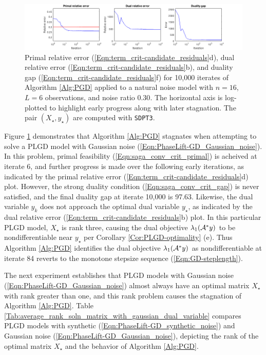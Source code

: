\begin{enumerate}
\begin{figure}[H]
\hspace{-1.7cm}  \includegraphics[scale=0.6]{noisy_random_signal_relative_errors_stagnate}
\caption{Primal relative error (\ref{Eqn:term_crit-candidate_residuals}d), dual relative error (\ref{Eqn:term_crit-candidate_residuals}b), and duality gap (\ref{Eqn:term_crit-candidate_residuals}f) for 10,000 iterates of Algorithm \ref{Alg:PGD} applied to a natural noise model with $n=16$, $L=6$ observations, and noise ratio $0.30$.  The horizontal axis is log-plotted to highlight early progress along with later stagnation.  The pair $(X_\star, y_\star)$ are computed with \texttt{SDPT3}.}
\label{Fig:noisy_random_relative_errors_stagnate}
\end{figure}


Figure \ref{Fig:noisy_random_relative_errors_stagnate} demonstrates that Algorithm \ref{Alg:PGD} stagnates when attempting to solve a PLGD model with Gaussian noise (\ref{Eqn:PhaseLift-GD_Gaussian_noise}).  In this problem, primal feasibility (\ref{Eqn:saga_conv_crit_primal}) is acheived at iterate 6, and further progress is made over the following early iterations, as indicated by the primal relative error (\ref{Eqn:term_crit-candidate_residuals}d) plot.  However, the strong duality condition (\ref{Eqn:saga_conv_crit_gap}) is never satisfied, and the final duality gap at iterate 10,000 is 97.63.  Likewise, the dual variable $y_k$ does not approach the optimal dual variable $y_\star$, as indicated by the dual relative error (\ref{Eqn:term_crit-candidate_residuals}b) plot.  In this particular PLGD model, $X_\star$ is rank three, causing the dual objective $\lambda_1({\mathcal A}^*y)$ to be nondifferentiable near $y_\star$ per Corollary \ref{Cor:PLGD-optimality} (e).  Thus Algorithm \ref{Alg:PGD} identifies the dual objective $\lambda_1({\mathcal A}^*y)$ as nondifferentiable at iterate 84 reverts to the monotone stepsize sequence (\ref{Eqn:GD-steplength}).  


The next experiment establishes that PLGD models with Gaussian noise (\ref{Eqn:PhaseLift-GD_Gaussian_noise}) almost always have an optimal matrix $X_\star$ with rank greater than one, and this rank problem causes the stagnation of Algorithm \ref{Alg:PGD}.  Table \ref{Tab:average_rank_soln_matrix_with_gaussian_dual_variable} compares PLGD models with synthetic (\ref{Eqn:PhaseLift-GD_synthetic_noise}) and Gaussian noise (\ref{Eqn:PhaseLift-GD_Gaussian_noise}), depicting the rank of the optimal matrix $X_\star$ and the behavior of Algorithm \ref{Alg:PGD}.


\end{enumerate}
